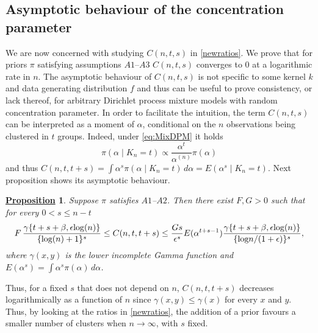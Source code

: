 \documentclass[12pt]{article}
\newtheorem{Prop}{\underline{\bf Proposition}}
\def\log{\hbox{log}}
\begin{document}
\subsection{Asymptotic behaviour of the concentration parameter}\label{sec:alpha}
We are now concerned with studying $C(n,t,s)$ in \eqref{newratios}. 
We prove that for priors $\pi$ satisfying assumptions $A1$--$A3$ %
$C(n,t,s)$ converges to $0$ at a logarithmic rate in $n$.
The asymptotic behaviour of $C(n,t,s)$ is not specific to some  %
kernel $k$ and data generating distribution $f$ and thus can be useful to prove consistency, or lack thereof, for arbitrary Dirichlet process mixture models with random concentration parameter.
In order to facilitate the intuition, the term $C(n,t,s)$ can be interpreted as a moment of $\alpha$, conditional on the $n$ observations being clustered in $t$ groups. Indeed, under \eqref{eq:MixDPM} it holds
\[
\pi(\alpha \mid K_n=t) \propto \frac{\alpha^t}{\alpha^{(n)}} \pi(\alpha)
\]
and thus $C(n,t,t+s) = \int \alpha^{s} \pi(\alpha \mid K_n=t) \, d\alpha = E(\alpha^{s} \mid K_n = t)$. Next proposition shows its asymptotic behaviour.
\begin{Prop}\label{prop:Prior}
Suppose $\pi$ satisfies %
$A1$--$A2$. Then there exist $F, G >0$ such that for every $0 < s \leq n-t$ %
\[
\begin{aligned}
F \, \frac{\gamma\{t+s+\beta,\epsilon\log(n)\}}{\{\log(n)+1\}^{s}} \leq C(n,t, t+s) \leq \frac{Gs}{\epsilon^s}E(\alpha^{t+s-1})\frac{\gamma\{t+s+\beta,\epsilon\log(n)\}}{\{\log n/(1+\epsilon)\}^{s}},
\end{aligned}
\]
where $\gamma(x,y)$ is the lower incomplete Gamma function and %
$E(\alpha^s) = \int \alpha^s \pi(\alpha) \, d\alpha$.
\end{Prop}
Thus, for a fixed $s$ that does not depend on $n$, $C(n,t,t+s)$ decreases logarithmically as a function of $n$ since $\gamma(x,y) \leq \gamma(x)$ for every $x$ and $y$. Thus, by looking at the ratios in \eqref{newratios}, the addition of a prior favours a smaller number of clusters when $n \to \infty$, with $s$ fixed.
\end{document}
